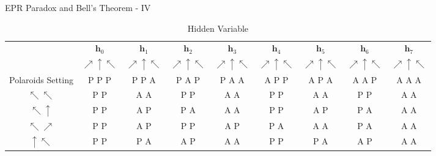 \documentclass{beamer}
\begin{document}
\begin{frame}{EPR Paradox and Bell's Theorem - IV}
  {\tiny
  \begin{table}[h!]
  \begin{center}
    \caption{Hidden Variable}
    \label{tab:table1}
    \begin{tabular}{c|c|c|c|c|c|c|c|c}
                          & $\mathbf{h}_0$                & $\mathbf{h}_1$                & $\mathbf{h}_2$                & $\mathbf{h}_3$                & $\mathbf{h}_4$                & $\mathbf{h}_5$                & $\mathbf{h}_6$                & $\mathbf{h}_7$ \\
                          & $\nearrow  \uparrow \nwarrow$ & $\nearrow  \uparrow \nwarrow$ & $\nearrow  \uparrow \nwarrow$ & $\nearrow  \uparrow \nwarrow$ & $\nearrow  \uparrow \nwarrow$ & $\nearrow  \uparrow \nwarrow$ & $\nearrow  \uparrow \nwarrow$ & $\nearrow  \uparrow \nwarrow$ \\
        Polaroids Setting & P          P        P         & P          P        A         & P          A        P         & P          A        A         & A          P        P         & A          P        A         & A          A        P         & A          A        A         \\
      \hline
      $\nwarrow \nwarrow$ & P          P                  & A          A                  & P          P                  & A          A                  & P          P                  & A          A                  & P          P                  & A          A                  \\
      $\nwarrow \uparrow$ & P          P                  & A          P                  & P          A                  & A          A                  & P          P                  & A          P                  & P          A                  & A          A                  \\
      $\nwarrow \nearrow$ & P          P                  & A          P                  & P          P                  & A          P                  & P          A                  & A          A                  & P          A                  & A          A                  \\
      $\uparrow \nwarrow$ & P          P                  & P          A                  & A          P                  & A          A                  & P          P                  & P          A                  & A          P                  & A          A                  \\

\end{tabular}
\end{center}
\end{table}}
\end{frame}
\end{document}
